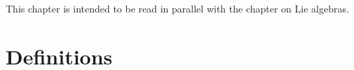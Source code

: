 
This chapter is intended to be read in parallel with the chapter on Lie algebras.

\section{Definitions}






